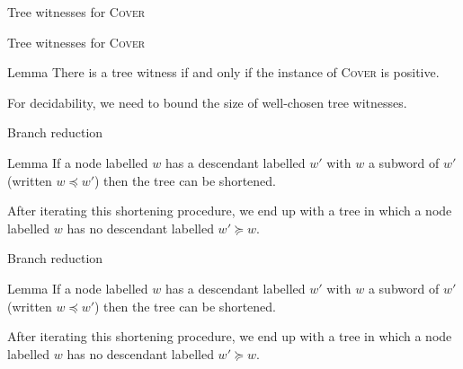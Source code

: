 \documentclass{beamer}
\newcommand{\COVER}{\textsc{Cover}\xspace}
\begin{document}
	

\begin{frame}{Tree witnesses for \COVER}
	
	\centering
	
	
\end{frame}

\begin{frame}{Tree witnesses for \COVER}
	\begin{center}
	\resizebox{!}{4.5cm}{
	
	}
	\end{center}
\pause

\begin{block}{Lemma}
There is a tree witness if and only if the instance of \COVER is positive.  
\end{block}
For decidability, we need to bound the size of well-chosen tree witnesses.
\end{frame}

\begin{frame}{Branch reduction}
	
	\begin{block}{Lemma}
		If a node labelled $w$ has a descendant labelled $w'$ with $w$ a subword of $w'$ (written $w \preceq w'$) then the tree can be shortened.
	\end{block}
	\begin{center}
	
	\end{center}
	\pause \pause \pause
	\vspace{-1cm}
	
	After iterating this shortening procedure, we end up with a tree in which a node labelled $w$ has no descendant labelled $w' \succeq w$. 
\end{frame}
\begin{frame}{Branch reduction}
	
	\begin{block}{Lemma}
		If a node labelled $w$ has a descendant labelled $w'$ with $w$ a subword of $w'$ (written $w \preceq w'$) then the tree can be shortened.
	\end{block}
	\begin{center}
	
	\end{center}
	\pause \pause \pause
	\vspace{-1cm}
	
	After iterating this shortening procedure, we end up with a tree in which a node labelled $w$ has no descendant labelled $w' \succeq w$. 
\end{frame}
\end{document}
